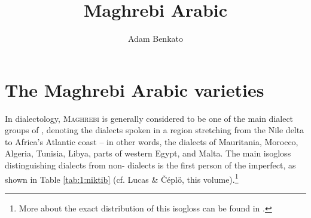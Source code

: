 \documentclass[output=paper]{langsci/langscibook}
\author{Adam Benkato\affiliation{University of California, Berkeley}}
\title{Maghrebi Arabic}
\begin{document}
\section{The Maghrebi Arabic varieties}

In  dialectology, \textsc{Maghrebi} is generally considered to be one of the main dialect groups of , denoting the dialects spoken in a region stretching from the Nile delta to Africa’s Atlantic coast -- in other words, the dialects of Mauritania, Morocco, Algeria, Tunisia, Libya, parts of western Egypt, and Malta. The main isogloss distinguishing  dialects from non- dialects is the first person of the imperfect, as shown in Table \ref{tab:1:niktib} (cf. Lucas \& Čéplö, this volume).\footnote{More about the exact distribution of this isogloss can be found in \citet{Behnstedt2016niktib}.}


\begin{table}
\caption{First-person imperfect `write' in Maghrebi and non-Maghrebi Arabic}
\label{tab:1:niktib}
\end{table}
\end{document}
